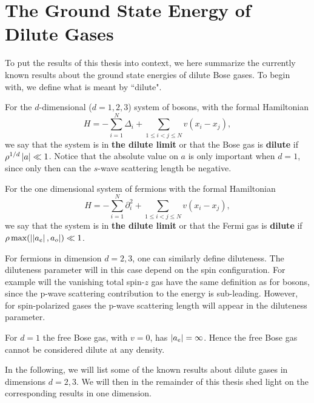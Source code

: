 \section{The Ground State Energy of Dilute Gases}
To put the results of this thesis into context, we here summarize the currently known results about the ground state energies of dilute Bose gases. To begin with, we define what is meant by ``dilute".
\begin{definition}
	For the $ d $-dimensional ($ d=1,2,3 $) system of bosons, with the formal Hamiltonian \begin{equation}
	H=-\sum_{i=1}^{N}\Delta_i+\sum_{1\leq i<j\leq N}v(x_i-x_j),
	\end{equation}
	we say that the system is in \textbf{ the dilute limit} or that the Bose gas is \textbf{dilute} if $ \rho^{1/d} \left\lvert a \right\rvert\ll 1 $. Notice that the absolute value on $ a $ is only important when $ d=1 $, since only then can the $ s $-wave scattering length be negative.
\end{definition}
\begin{definition}
	For the one dimensional system of fermions with the formal Hamiltonian \begin{equation}
	H=-\sum_{i=1}^{N}\partial^2_i+\sum_{1\leq i<j\leq N}v(x_i-x_j),
	\end{equation}
	we say that the system is in \textbf{ the dilute limit} or that the Fermi gas is \textbf{dilute} if $ \rho \max(\left\lvert \left\lvert a_e \right\rvert,a_o \right\rvert)\ll 1 $.
\end{definition}
\begin{remark}
	For fermions in dimension $ d=2,3 $, one can similarly define diluteness. The diluteness parameter will in this case depend on the spin configuration. For example will the vanishing total spin-$ z $ gas have the same definition as for bosons, since the p-wave scattering contribution to the energy is sub-leading. However, for spin-polarized gases the p-wave scattering length will appear in the diluteness parameter.
\end{remark}
\begin{remark}
	For $ d=1 $ the free Bose gas, \ie with $ v=0 $, has $ \left\lvert a_e \right\rvert=\infty $. Hence the free Bose gas cannot be considered dilute at any density.
\end{remark}
In the following, we will list some of the known results about dilute gases in dimensions $ d=2,3 $. We will then in the remainder of this thesis shed light on the corresponding results in one dimension.
